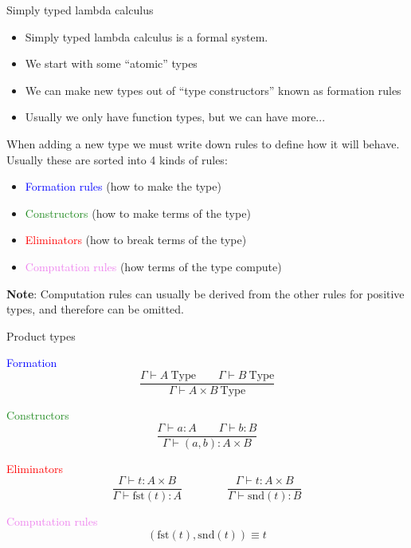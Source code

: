 \documentclass[usenames,dvipsnames]{beamer}
\newcommand{\blu}[1]{\textcolor{blue}{#1}}
\newcommand{\gre}[1]{\textcolor{ForestGreen}{#1}}
\newcommand{\red}[1]{\textcolor{red}{#1}}
\newcommand{\yel}[1]{\textcolor{violet}{#1}}
\begin{document}
    \begin{frame}{Simply typed lambda calculus}
        \begin{itemize}
            \item Simply typed lambda calculus is a formal system.
            \item We start with some ``atomic'' types
            \item We can make new types out of ``type constructors'' known as formation rules
            \item Usually we only have function types, but we can have more...
        \end{itemize}
        When adding a new type we must write down rules to define how it will behave.
        Usually these are sorted into 4 kinds of rules:
        \begin{itemize}
            \item \blu{Formation rules} (how to make the type)
            \item \gre{Constructors} (how to make terms of the type)
            \item \red{Eliminators} (how to break terms of the type)
            \item \yel{Computation rules} (how terms of the type compute)
        \end{itemize}
        \textbf{Note}: Computation rules can usually be derived from the other rules for positive types, and therefore can be omitted.
    \end{frame}

    \begin{frame}{Product types}
        \begin{block}{\blu{Formation}}
            $$\frac{\Gamma \vdash A\ \text{Type}\qquad \Gamma \vdash B\ \text{Type} }{\Gamma \vdash A \times B\ \text{Type}}$$
        \end{block}
        
        \begin{block}{\gre{Constructors}}
            $$\frac{\Gamma \vdash a : A\qquad \Gamma \vdash b : B}{\Gamma\vdash (a,b) : A\times B}$$
        \end{block}
        
        \begin{block}{\red{Eliminators}}
            $$\frac{\Gamma \vdash t : A \times B}{\Gamma\vdash\text{fst}(t) : A} \qquad\qquad
              \frac{\Gamma \vdash t : A \times B}{\Gamma\vdash\text{snd}(t) : B}$$
        \end{block}
        
        \begin{block}{\yel{Computation rules}}
            $$(\text{fst}(t), \text{snd}(t)) \equiv t$$
        \end{block}
    \end{frame}    
    
\end{document}
